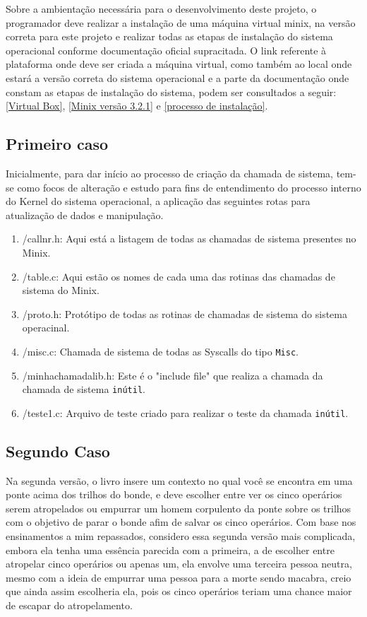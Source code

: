 \documentclass[12pt]{article}
\begin{document}
Sobre a ambientação necessária para o desenvolvimento deste projeto, o programador deve realizar a instalação de uma máquina virtual minix, na versão correta para este projeto
e realizar todas as etapas de instalação do sistema operacional conforme documentação oficial supracitada. O link referente à plataforma onde deve ser criada a máquina virtual,
como também ao local onde estará a versão correta do sistema operacional e a parte da documentação onde constam as etapas de instalação do sistema, podem ser consultados a seguir:
\href{https://www.virtualbox.org/wiki/Downloads}{[Virtual Box]}, \href{https://wiki.minix3.org/doku.php?id=www:download:start}{[Minix versão 3.2.1]} e \href{https://wiki.minix3.org/doku.php?id=usersguide:runningonvirtualbox}{[processo de instalação]}.


\subsection{Primeiro caso} \label{sec:1sec}
Inicialmente, para dar início ao processo de criação da chamada de sistema, tem-se como focos de alteração e estudo para fins de entendimento do processo interno do
Kernel do sistema operacional, a aplicação das seguintes rotas para atualização de dados e manipulação.

\begin{enumerate}
    \item /callnr.h: Aqui está a listagem de todas as chamadas de sistema presentes no Minix.
    \item /table.c: Aqui estão os nomes de cada uma das rotinas das chamadas de sistema do Minix.
    \item /proto.h: Protótipo de todas as rotinas de chamadas de sistema do sistema operacinal.
    \item /misc.c: Chamada de sistema de todas as Syscalls do tipo \texttt{Misc}.
    \item /minhachamadalib.h: Este é o "include file" que realiza a chamada da chamada de sistema \texttt{inútil}.
    \item /teste1.c: Arquivo de teste criado para realizar o teste da chamada \texttt{inútil}.
\end{enumerate}


\subsection{Segundo Caso} \label{sec:2sec}

Na segunda versão, o livro insere um contexto no qual você se encontra em uma ponte acima dos trilhos do bonde, e deve escolher entre ver os cinco operários serem atropelados ou empurrar um homem corpulento da ponte sobre os trilhos com o objetivo de parar o bonde afim de salvar os cinco operários. Com base nos ensinamentos a mim repassados, considero essa segunda versão mais complicada, embora ela tenha uma essência parecida com a primeira, a de escolher entre atropelar cinco operários ou apenas um, ela envolve uma terceira pessoa neutra, mesmo com a ideia de empurrar uma pessoa para a morte sendo macabra, creio que ainda assim escolheria ela, pois os cinco operários teriam uma chance maior de escapar do atropelamento.
\end{document}
